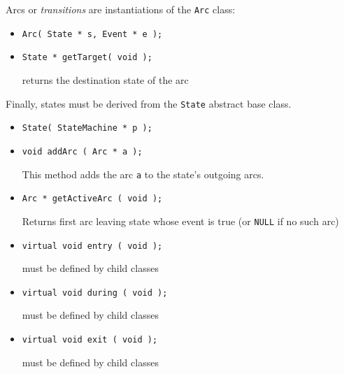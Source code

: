 Arcs or {\em transitions} are instantiations of the {\tt Arc} class:

\begin{moduleheader}
 \mline
{} \mline
\end{moduleheader}

\constructors

\begin{itemize}
\item {\tt Arc( State * s, Event * e );}
\end{itemize}

\localinterface

\begin{itemize}
\item{\tt State * getTarget( void );} \par
returns the destination state of the arc 
\end{itemize}

Finally, states must be derived from the {\tt State} abstract base class. 

\begin{moduleheader}
 \mline
{} \mline
\end{moduleheader}

\constructors

\begin{itemize}
\item{\tt State( StateMachine * p );}
\end{itemize}

\localinterface

\begin{itemize}
\item{\tt void addArc ( Arc * a );} \par
This method adds the arc {\tt a} to the state's outgoing arcs.
\item{\tt Arc * getActiveArc ( void );} \par
Returns first arc leaving state whose event is true (or {\tt NULL} if no
such arc)
\item{\tt virtual void entry ( void );} \par
must be defined by child classes
\item{\tt virtual void during ( void );} \par
must be defined by child classes
\item{\tt virtual void exit ( void );} \par
must be defined by child classes
\end{itemize}

